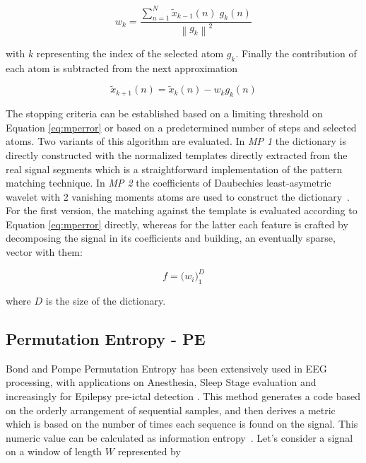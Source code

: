 \documentclass[brainsci,article,submit,moreauthors,pdftex,10pt,a4paper]{mdpi}
\begin{document}
\begin{equation}
w_{k} =  \frac{\sum_{n=1}^{N} \tilde{x}_{k-1}(n) \; g_{k}(n)}{  {\left\lVert  g_{k} \right\rVert}^{2} }
\label{eq:mp4}
\end{equation}

with $k$ representing the index of the selected atom $g_{k}$.  Finally the contribution of each atom is subtracted from the next approximation~\citep{Cohen2014,Sanei2007, Mallat1993}

\begin{equation}
\tilde{x}_{k+1}(n)=  \tilde{x}_{k}(n) - w_{k} g_{k} (n)
\label{eq:mp5}
\end{equation}

The stopping criteria can be established based on a limiting threshold on Equation \ref{eq:mperror} or based on a predetermined number of steps and selected atoms.  Two variants of this algorithm are evaluated. In \textit{MP 1} the dictionary is directly constructed with the normalized templates directly extracted from the real signal segments which is a straightforward implementation of the pattern matching technique.  In \textit{MP 2} the coefficients of Daubechies least-asymetric wavelet with 2 vanishing moments atoms are used to construct the dictionary~\citep{Vareka2012}.  For the first version, the matching against the template is evaluated according to Equation \ref{eq:mperror} directly, whereas for the latter each feature is crafted by decomposing the signal in its coefficients and building, an eventually sparse, vector with them:

\begin{equation}
f =  {\bigg ( w_{i} \bigg )}_{1}^{D} 
\label{eq:mp6}
\end{equation}

\noindent where $D$ is the size of the dictionary.  



\subsection{Permutation Entropy - PE}

Bond and Pompe Permutation Entropy has been extensively used in EEG processing, with applications on Anesthesia, Sleep Stage evaluation and increasingly for Epilepsy pre-ictal detection \citep{Bandt2002}.  This method generates a code based on the orderly arrangement of sequential samples, and then derives a metric which is based on the number of times each sequence is found on the signal.  This numeric value can be calculated as information entropy~\citep{Nicolaou2010}. Let's consider a signal on a window of length $W$ represented by 
\end{document}
